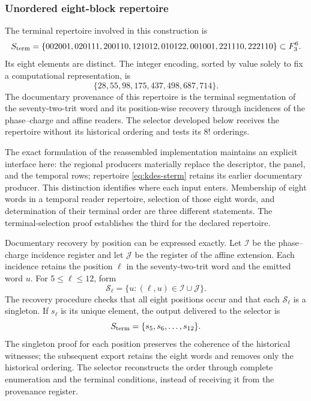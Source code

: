 \subsubsection{Unordered eight-block repertoire}

The terminal repertoire involved in this construction is
\begin{equation}
 \mathcal S_{\rm term}=
 \{002001,020111,200110,121012,
   010122,001001,221110,222110\}\subset\mathbb F_3^6.
 \label{eq:kdes-sterm}
\end{equation}
Its eight elements are distinct. The integer encoding, sorted by
value solely to fix a computational representation, is
\[
 \{28,55,98,175,437,498,687,714\}.
\]
The documentary provenance of this repertoire is the terminal segmentation
of the seventy-two-trit word and its position-wise recovery
through incidences of the phase--charge and affine readers. The selector
developed below receives the repertoire without its historical
ordering and tests its $8!$ orderings.

The exact formulation of the reassembled implementation maintains an
explicit interface here: the regional producers materially replace
the descriptor, the panel, and the temporal rows; repertoire
\eqref{eq:kdes-sterm} retains its earlier documentary producer. This
distinction identifies where each input enters. Membership of
eight words in a temporal reader repertoire, selection of those
eight words, and determination of their terminal order are three
different statements. The terminal-selection proof establishes the
third for the declared repertoire.

Documentary recovery by position can be expressed
exactly. Let $\mathcal I$ be the phase--charge incidence register and let
$\mathcal J$ be the register of the affine extension. Each incidence retains
the position $\ell$ in the seventy-two-trit word and the
emitted word $u$. For $5\leq\ell\leq12$, form
\[
 \mathcal S_\ell=
 \{u:(\ell,u)\in\mathcal I\cup\mathcal J\}.
\]
The recovery procedure checks that all eight positions occur and that each
$\mathcal S_\ell$ is a singleton. If $s_\ell$ is its unique element,
the output delivered to the selector is
\[
 \mathcal S_{\rm term}=\{s_5,s_6,\ldots,s_{12}\}.
\]
The singleton proof for each position preserves the coherence of the
historical witnesses; the subsequent export retains the eight
words and removes only the historical ordering. The selector
reconstructs the order through complete enumeration and the terminal
conditions, instead of receiving it from the provenance register.

